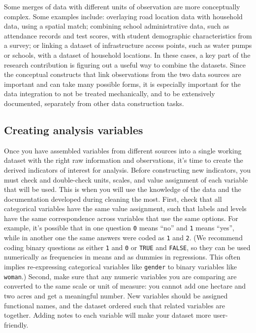 Some merges of data with different units of observation
are more conceptually complex.
Some examples include: overlaying road location data with household data,
using a spatial match; combining school administrative data, such as attendance records and test scores,
with student demographic characteristics from a survey;
or linking a dataset of infrastructure access points, such as water pumps or schools,
with a dataset of household locations.
In these cases, a key part of the research contribution is figuring out
a useful way to combine the datasets.
Since the conceptual constructs that link observations from the two data sources
are important and can take many possible forms,
it is especially important for the data integration to not be treated mechanically,
and to be extensively documented, separately from other data construction tasks.


\subsection{Creating analysis variables}

Once you have assembled variables from different sources into a single working dataset
with the right raw information and observations,
it's time to create the derived indicators of interest for analysis.
Before constructing new indicators,
you must check and double-check units, scales, and value assignment of each variable that will be used.
This is when you will use the knowledge
of the data and the documentation developed during cleaning the most.
First, check that all categorical variables have the same value assignment,
such that labels and levels have the same correspondence across variables that use the same options.
For example, it's possible that in one question \texttt{0} means ``no'' and \texttt{1} means ``yes'',
while in another one the same answers were coded as \texttt{1} and \texttt{2}.
(We recommend coding binary questions as either \texttt{1} and \texttt{0} or \texttt{TRUE} and \texttt{FALSE},
so they can be used numerically as frequencies in means and as dummies in regressions.
This often implies re-expressing categorical variables like \texttt{gender} to binary variables like \texttt{woman}.)
Second, make sure that any numeric variables you are comparing
are converted to the same scale or unit of measure:
you cannot add one hectare and two acres and get a meaningful number.
New variables should be assigned functional names,
and the dataset ordered such that related variables are together.
Adding notes to each variable will make your dataset more user-friendly.

